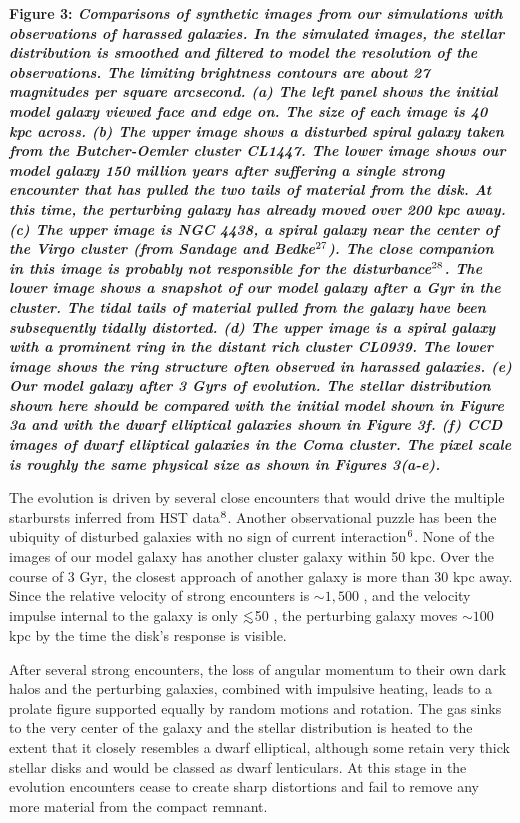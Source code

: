 {\bf Figure 3: \em Comparisons of synthetic images from our
simulations with observations of harassed galaxies.  In the simulated
images, the stellar distribution is smoothed and filtered to model the
resolution of the observations.  The limiting brightness contours are
about 27 magnitudes per square arcsecond.  (a) The left panel shows
the initial model galaxy viewed face and edge on.  The size of each
image is 40 kpc across.  (b) The upper image shows a disturbed spiral
galaxy taken from the Butcher-Oemler cluster CL1447. The lower image
shows our model galaxy 150 million years after suffering a single
strong encounter that has pulled the two tails of material from the
disk. At this time, the perturbing galaxy has already moved over 200
kpc away.  (c) The upper image is NGC 4438, a spiral galaxy near the
center of the Virgo cluster (from Sandage and Bedke$^{\bf\rm 27}$).
The close companion in this image is probably not responsible for the
disturbance$^{\bf\rm 28}$. The lower image shows a snapshot of our model galaxy
after a Gyr in the cluster.  The tidal tails of material pulled from
the galaxy have been subsequently tidally distorted.  (d) The upper
image is a spiral galaxy with a prominent ring in the distant rich
cluster CL0939.  The lower image shows the ring structure often
observed in harassed galaxies.  (e) Our model galaxy after 3 Gyrs of
evolution.  The stellar distribution shown here should be compared
with the initial model shown in Figure 3a and with the dwarf
elliptical galaxies shown in Figure 3f.  (f) CCD images of dwarf
elliptical galaxies in the Coma cluster.  The pixel scale is roughly
the same physical size as shown in Figures 3(a-e).  }

\oneskip

The evolution is driven by several close encounters that would drive
the multiple starbursts inferred from HST data$^{\bf\rm 8}$.
Another observational puzzle has been the ubiquity of disturbed galaxies
with no sign of current interaction$^{\bf\rm 6}$.  None of the images
of our model galaxy has another cluster galaxy within 50 kpc.  Over
the course of 3 Gyr, the closest approach of another galaxy is more
than 30 kpc away.  Since the relative velocity of strong encounters is
$\sim 1,500$ \kms, and the velocity impulse internal to the galaxy is
only $\lsim$50 \kms, the perturbing galaxy moves $\sim 100$ kpc by the
time the disk's response is visible.

After several strong encounters, the loss of angular momentum to their
own dark halos and the perturbing galaxies, combined with impulsive
heating, leads to a prolate figure supported equally by random motions
and rotation.  The gas sinks to the very center of the galaxy and the
stellar distribution is heated to the extent that it closely resembles
a dwarf elliptical, although some retain very thick stellar disks and
would be classed as dwarf lenticulars.  At this stage in the evolution
encounters cease to create sharp distortions and fail to remove any
more material from the compact remnant.

